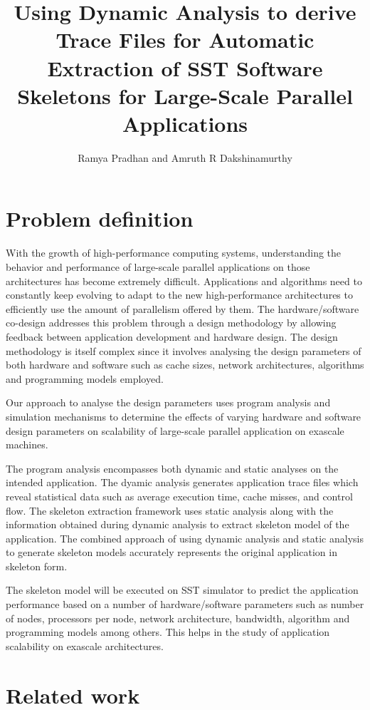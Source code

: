 \documentclass[10pt, twocolumn]{article}
\title{Using Dynamic Analysis to derive Trace Files for Automatic Extraction of SST Software Skeletons for Large-Scale Parallel Applications}
\author{Ramya Pradhan and Amruth R Dakshinamurthy}
\begin{document}
\maketitle
\section{Problem definition}
With the growth of high-performance computing systems, understanding the behavior and performance of large-scale parallel applications on those architectures has become extremely difficult. Applications and algorithms need to constantly keep evolving to adapt to the new high-performance architectures to efficiently use the amount of parallelism offered by them. The hardware/software co-design addresses this problem through a design methodology by allowing feedback between application development and hardware design. The design methodology is itself complex since it involves analysing the design parameters of both hardware and software such as cache sizes, network architectures, algorithms and programming models employed.  

Our approach to analyse the design parameters uses program analysis and simulation mechanisms to determine the effects of varying hardware and software design parameters on scalability of large-scale parallel application on exascale machines.  

The program analysis encompasses both dynamic and static analyses on the intended application. The dyamic analysis generates application trace files which reveal statistical data such as average execution time, cache misses, and control flow. The skeleton extraction framework uses static analysis along with the information obtained during dynamic analysis to extract skeleton model of the application. The combined approach of using dynamic analysis and static analysis to generate skeleton models accurately represents the original application in skeleton form. 

The skeleton model will be executed on SST simulator to predict the application performance based on a number of hardware/software parameters such as number of nodes, processors per node, network architecture, bandwidth, algorithm and programming models among others. This helps in the study of application scalability on exascale architectures.


\section{Related work}
\end{document}
